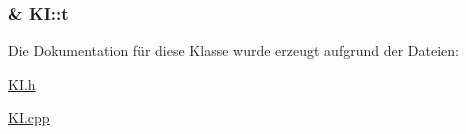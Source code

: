 \subsubsection[{t}]{\& K\+I\+::t\hspace{0.3cm}{\ttfamily [private]}}\label{class_k_i_a611b37548d94d9dce7e68024aa943733}


Die Dokumentation für diese Klasse wurde erzeugt aufgrund der Dateien\+:\begin{DoxyCompactItemize}
\item 
\hyperlink{_k_i_8h}{K\+I.\+h}\item 
\hyperlink{_k_i_8cpp}{K\+I.\+cpp}\end{DoxyCompactItemize}
